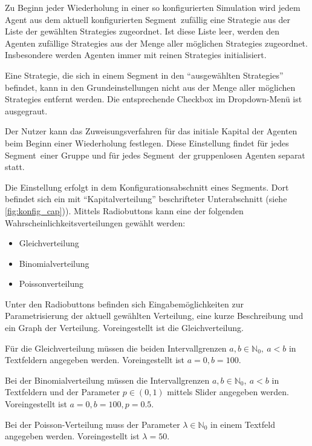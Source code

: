 \documentclass[parskip=full,11pt]{scrartcl}
\def\segment{Segment}
\begin{document}
Zu Beginn jeder Wiederholung in einer so konfigurierten Simulation wird jedem Agent aus dem aktuell konfigurierten \segment\ zufällig eine \Gls{Strategie} aus der Liste der gewählten \Glspl{Strategie} zugeordnet. Ist diese Liste leer, werden den Agenten zufällige \Glspl{Strategie} aus der Menge aller möglichen \Glspl{Strategie} zugeordnet. Insbesondere werden Agenten immer mit reinen \Glspl{Strategie} initialisiert.

Eine \Gls{Strategie}, die sich in einem Segment in den \enquote{ausgewählten \Glspl{Strategie}} befindet, kann in den Grundeinstellungen nicht aus der Menge aller möglichen \Glspl{Strategie} entfernt werden. Die entsprechende Checkbox im Dropdown-Menü ist ausgegraut.

Der \Gls{Nutzer} kann das Zuweisungsverfahren für das initiale \Gls{Kapital} der Agenten beim Beginn einer Wiederholung festlegen. Diese Einstellung findet für jedes \segment\ einer Gruppe und für jedes \segment\ der gruppenlosen Agenten separat statt.

Die Einstellung erfolgt in dem Konfigurationsabschnitt eines \segment s. Dort befindet sich ein mit \enquote{Kapitalverteilung} beschrifteter Unterabschnitt (siehe \cref{fig:konfig_cap})). Mittels Radiobuttons kann eine der folgenden Wahrscheinlichkeitsverteilungen gewählt werden:
\begin{itemize}\itemsep -10pt
\item Gleichverteilung
\item Binomialverteilung
\item Poissonverteilung
\end{itemize}
Unter den Radiobuttons befinden sich Eingabemöglichkeiten zur Parametrisierung der aktuell gewählten Verteilung, eine kurze Beschreibung und ein Graph der Verteilung. Voreingestellt ist die Gleichverteilung.

Für die Gleichverteilung müssen die beiden Intervallgrenzen \(a,b \in \mathbb{N}_0, \ a < b\) in Textfeldern angegeben werden. Voreingestellt ist \(a = 0, b = 100\).

Bei der Binomialverteilung müssen die Intervallgrenzen \(a,b \in \mathbb{N}_0, \ a < b\) in Textfeldern und der Parameter \(p \in (0,1)\) mittels Slider angegeben werden. Voreingestellt ist \(a = 0, b = 100, p = 0.5\).

Bei der Poisson-Verteilung muss der Parameter \(\lambda \in \mathbb{N}_0\) in einem Textfeld angegeben werden. Voreingestellt ist \(\lambda = 50\).
\end{document}
